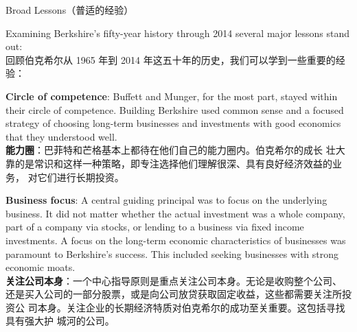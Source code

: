 \begin{section}{Broad Lessons（普适的经验）}

\begin{verseparallel}
  {
    Examining Berkshire's fifty-year history through 2014 several major
    lessons stand out: \\
  }
  {
    回顾伯克希尔从 1965 年到 2014 年这五十年的历史，我们可以学到一些重要的经验：
  }
\end{verseparallel}

{\color{green}{此处应为列表项 \\}}

\begin{verseparallel}
  {
    \textbf{Circle of competence}: Buffett and Munger, for the most part, stayed
    within their circle of competence. Building Berkshire used common sense and
    a focused strategy of choosing long-term businesses and investments with
    good economics that they understood well. \\
  }
  {
    \textbf{能力圈}：巴菲特和芒格基本上都待在他们自己的能力圈内。伯克希尔的成长
    壮大靠的是常识和这样一种策略，即专注选择他们理解很深、具有良好经济效益的业务，
    对它们进行长期投资。
  }
\end{verseparallel}

\begin{verseparallel}
  {
    \textbf{Business focus}: A central guiding principal was to focus on the
    underlying business. It did not matter whether the actual investment was a
    whole company, part of a company via stocks, or lending to a business via
    fixed income investments. A focus on the long-term economic characteristics
    of businesses was paramount to Berkshire's success. This included seeking
    businesses with strong economic moats. \\
  }
  {
    \textbf{关注公司本身}：一个中心指导原则是重点关注公司本身。无论是收购整个公司、
    还是买入公司的一部分股票，或是向公司放贷获取固定收益，这些都需要关注所投资公
    司本身。关注企业的长期经济特质对伯克希尔的成功至关重要。这包括寻找具有强大护
    城河的公司。
  }
\end{verseparallel}


\end{section}

